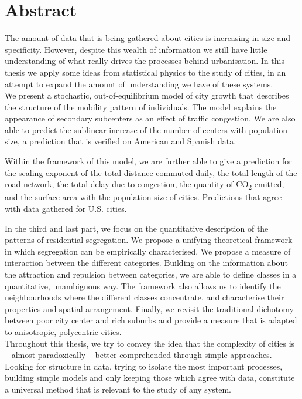 

\begingroup
\let\clearpage\relax
\let\cleardoublepage\relax
\let\cleardoublepage\relax

\chapter*{Abstract} %


The amount of data that is being gathered about cities is increasing in size and
specificity. However, despite this wealth of information we still have little
understanding of what really drives the processes behind urbanisation. In this
thesis we apply some ideas from statistical physics to the study of cities, in
an attempt to expand the amount of understanding we have of these systems.\\ 



We present a stochastic, out-of-equilibrium model of city growth that describes
the structure of the mobility pattern of individuals. The model explains the
appearance of secondary subcenters as an effect of traffic congestion. We are
also able to predict the sublinear increase of the number of centers with
population size, a prediction that is verified on American and Spanish data. 

Within the framework of this model, we are further able to give a prediction for the
scaling exponent of the total distance commuted daily, the total length of the
road network, the total delay due to congestion, the quantity of
CO\textsubscript{2} emitted, and the surface area with the population size of
cities. Predictions that agree with data gathered for U.S. cities.

In the third and last part, we focus on the quantitative description of the
patterns of residential segregation. We propose a unifying theoretical framework
in which segregation can be empirically characterised. We propose a measure of
interaction between the different categories. Building on the information about
the attraction and repulsion between categories, we are able to define classes
in a quantitative, unambiguous way. The framework also allows us to identify the
neighbourhoods where the different classes concentrate, and characterise their
properties and spatial arrangement. Finally, we revisit the traditional
dichotomy between poor city center and rich suburbs and provide a measure that
is adapted to anisotropic, polycentric cities.\\


Throughout this thesis, we try to convey the idea that the complexity of cities is --
almost paradoxically -- better comprehended through simple approaches. 
Looking for structure in data, trying to isolate the most important processes,
building simple models and only keeping those which agree with data, constitute
a universal method that is relevant to the study of any system.


\endgroup			

\vfill
